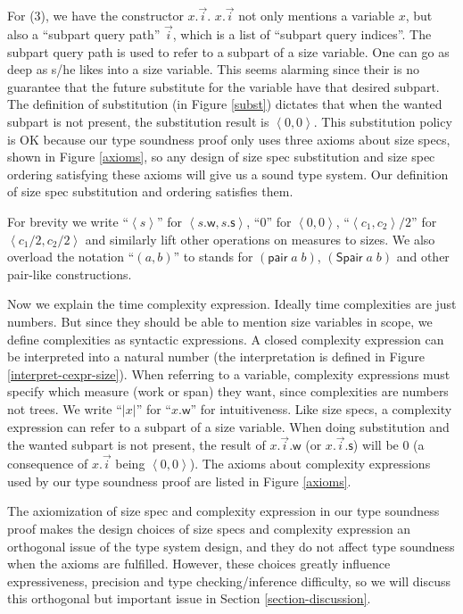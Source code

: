 \documentclass[preprint]{sigplanconf}
\newcommand{\sympair}{\mathsf{pair}}
\newcommand{\symSpair}{\mathsf{Spair}}
\newcommand{\symwork}{\mathsf{w}}
\newcommand{\symspan}{\mathsf{s}}
\newcommand{\Sstats}[1]{\left \langle #1 \right \rangle}
\begin{document}
For (3), we have the constructor $x.\vec{i}$. $x.\vec{i}$ not only mentions a variable $x$, but also a ``subpart query path'' $\vec{i}$, which is a list of ``subpart query indices''. The subpart query path is used to refer to a subpart of a size variable. One can go as deep as s/he likes into a size variable. This seems alarming since their is no guarantee that the future substitute for the variable have that desired subpart. The definition of substitution (in Figure \ref{subst}) dictates that when the wanted subpart is not present, the substitution result is $\Sstats{0,0}$. This substitution policy is OK because our type soundness proof only uses three axioms about size specs, shown in Figure \ref{axioms}, so any design of size spec substitution and size spec ordering satisfying these axioms will give us a sound type system. Our definition of size spec substitution and ordering satisfies them. 

For brevity we write ``$\Sstats{s}$'' for $\Sstats{s.\symwork,s.\symspan}$, ``0'' for $\Sstats{0,0}$, ``$\Sstats{c_1,c_2}/2$'' for $\Sstats{c_1/2,c_2/2}$ and similarly lift other operations on measures to sizes. We also overload the notation ``$(a,b)$'' to stands for $(\sympair\;a\;b)$, $(\symSpair\;a\;b)$ and other pair-like constructions.

Now we explain the time complexity expression. Ideally time complexities are just numbers. But since they should be able to mention size variables in scope, we define complexities as syntactic expressions. A closed complexity expression can be interpreted into a natural number (the interpretation is defined in Figure \ref{interpret-cexpr-size}). When referring to a variable, complexity expressions must specify which measure (work or span) they want, since complexities are numbers not trees. We write ``$|x|$'' for ``$x.\symwork$'' for intuitiveness. Like size specs, a complexity expression can refer to a subpart of a size variable. When doing substitution and the wanted subpart is not present, the result of $x.\vec{i}.\symwork$ (or $x.\vec{i}.\symspan$) will be 0 (a consequence of $x.\vec{i}$ being $\Sstats{0,0}$). The axioms about complexity expressions used by our type soundness proof are listed in Figure \ref{axioms}.

The axiomization of size spec and complexity expression in our type soundness proof makes the design choices of size specs and complexity expression an orthogonal issue of the type system design, and they do not affect type soundness when the axioms are fulfilled. However, these choices greatly influence expressiveness, precision and type checking/inference difficulty, so we will discuss this orthogonal but important issue in Section \ref{section-discussion}. 
\end{document}
